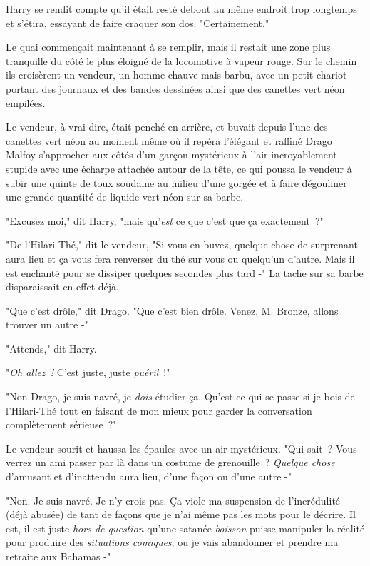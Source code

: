 Harry se rendit compte qu'il était resté debout au même endroit trop longtemps et s'étira, essayant de faire craquer son dos. "Certainement."

Le quai commençait maintenant à se remplir, mais il restait une zone plus tranquille du côté le plus éloigné de la locomotive à vapeur rouge. Sur le chemin ils croisèrent un vendeur, un homme chauve mais barbu, avec un petit chariot portant des journaux et des bandes dessinées ainsi que des canettes vert néon empilées.

Le vendeur, à vrai dire, était penché en arrière, et buvait depuis l'une des canettes vert néon au moment même où il repéra l'élégant et raffiné Drago Malfoy s'approcher aux côtés d'un garçon mystérieux à l'air incroyablement stupide avec une écharpe attachée autour de la tête, ce qui poussa le vendeur à subir une quinte de toux soudaine au milieu d'une gorgée et à faire dégouliner une grande quantité de liquide vert néon sur sa barbe.

"Excusez moi," dit Harry, "mais qu'\emph{est} ce que c'est que ça exactement~?"

"De l'Hilari-Thé," dit le vendeur, "Si vous en buvez, quelque chose de surprenant aura lieu et ça vous fera renverser du thé sur vous ou quelqu'un d'autre. Mais il est enchanté pour se dissiper quelques secondes plus tard -" La tache sur sa barbe disparaissait en effet déjà.

"Que c'est drôle," dit Drago. "Que c'est bien drôle. Venez, M. Bronze, allons trouver un autre -"

"Attends," dit Harry.

"\emph{Oh allez~!} C'est juste, juste \emph{puéril}~!"

"Non Drago, je suis navré, je \emph{dois} étudier ça. Qu'est ce qui se passe si je bois de l'Hilari-Thé tout en faisant de mon mieux pour garder la conversation complètement sérieuse~?"

Le vendeur sourit et haussa les épaules avec un air mystérieux. "Qui sait~? Vous verrez un ami passer par là dans un costume de grenouille~? \emph{Quelque chose} d'amusant et d'inattendu aura lieu, d'une façon ou d'une autre -"

"Non. Je suis navré. Je n'y crois pas. Ça viole ma suspension de l'incrédulité (déjà abusée) de tant de façons que je n'ai même pas les mots pour le décrire. Il est, il est juste \emph{hors de question} qu'une satanée \emph{boisson} puisse manipuler la réalité pour produire des \emph{situations comiques}, ou je vais abandonner et prendre ma retraite aux Bahamas -"

